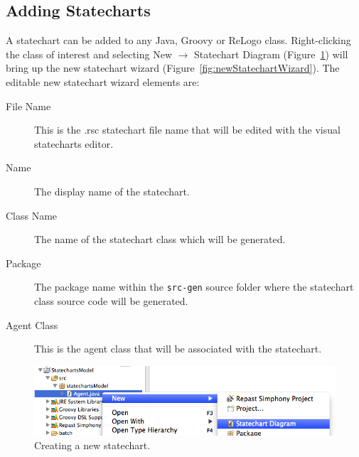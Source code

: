 \documentclass[11pt]{amsart}
\begin{document}
\subsection{Adding Statecharts}
A statechart can be added to any Java, Groovy or ReLogo class. Right-clicking the class of interest and selecting New $\rightarrow$ Statechart Diagram (Figure~\ref{fig:newStatechart}) will bring up the new statechart wizard (Figure~\ref{fig:newStatechartWizard}). The editable new statechart wizard elements are:
\begin{description}
\item[File Name] This is the .rsc statechart file name that will be edited with the visual statecharts editor.
\item[Name] The display name of the statechart.
\item[Class Name] The name of the statechart class which will be generated.
\item[Package] The package name within the \texttt{src-gen} source folder where the statechart class source code will be generated.
\item[Agent Class] This is the agent class that will be associated with the statechart.
\end{description}
\begin{figure}
\begin{center}
\vspace{.2in}
\centerline {
\includegraphics[width=5in]{StatechartsImages/NewStatechart.png}
}
\caption{Creating a new statechart.}
\label{fig:newStatechart}
\end{center}
\end{figure}
\end{document}
